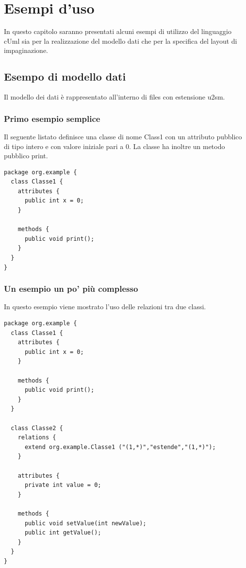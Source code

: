\chapter{Esempi d'uso}

In questo capitolo saranno presentati alcuni esempi di utilizzo del linguaggio
cUml sia per la realizzazione del modello dati che per la specifica del layout
di impaginazione.

\section{Esempo di modello dati}
Il modello dei dati è rappresentato all'interno di files con estensione u2sm.

\subsection{Primo esempio semplice}
Il seguente listato definisce una classe di nome Class1 con un attributo
pubblico di tipo intero e con valore iniziale pari a 0. La classe ha inoltre un
metodo pubblico print.
\begin{lstlisting}[caption={Semplice esempio di modello}, style={model}]
package org.example {
  class Classe1 {
    attributes {
      public int x = 0;
    }
  
    methods {
      public void print();
    }
  }
}
\end{lstlisting}

\subsection{Un esempio un po' più complesso}
In questo esempio viene mostrato l'uso delle relazioni tra due classi.

\begin{lstlisting}[caption={Un esempio un po' più complesso}, style={model}]
package org.example {
  class Classe1 {
    attributes {
      public int x = 0;
    }

    methods {
      public void print();
    }
  }

  class Classe2 {
    relations {
      extend org.example.Classe1 ("(1,*)","estende","(1,*)");
    }

    attributes {
      private int value = 0;
    }

    methods {
      public void setValue(int newValue);
      public int getValue();
    }
  }
}
\end{lstlisting}


